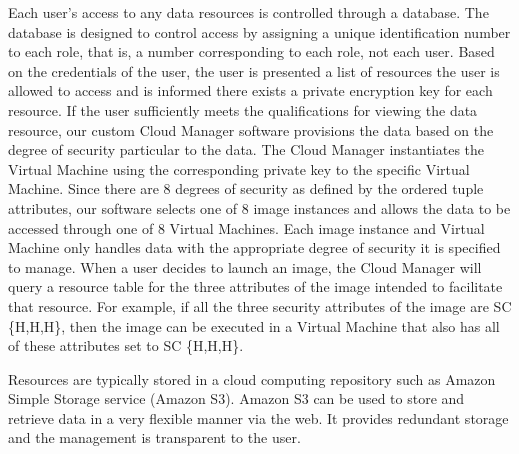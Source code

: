 \documentclass{acm_proc_article-sp}
\begin{document}
Each user's access to any data resources is controlled through a database. The database is designed to control access by assigning a unique identification number to each role, that is, a number corresponding to each role, not each user. Based on the credentials of the user, the user is presented a list of resources the user is allowed to access and is informed there exists a private encryption key for each resource. If the user sufficiently meets the qualifications for viewing the data resource, our custom Cloud Manager software provisions the data based on the degree of security particular to the data. The Cloud Manager instantiates the Virtual Machine using the corresponding private key to the specific Virtual Machine. Since there are 8 degrees of security as defined by the ordered tuple attributes, our software selects one of 8 image instances and allows the data to be accessed through one of 8 Virtual Machines.  Each image instance and Virtual Machine only handles data with the appropriate degree of security it is specified to manage. When a user decides to launch an image, the Cloud Manager will query a resource table for the three attributes of the image intended to facilitate that resource. For example, if all the three security attributes of the image are SC \{H,H,H\}, then the image can be executed in a Virtual Machine that also has all of these attributes set to SC \{H,H,H\}. 

Resources are typically stored in a cloud computing repository such as Amazon Simple Storage service (Amazon S3). Amazon S3 can be used to store and retrieve data in a very flexible manner via the web. It provides redundant storage and the management is transparent to the user.
\end{document}
